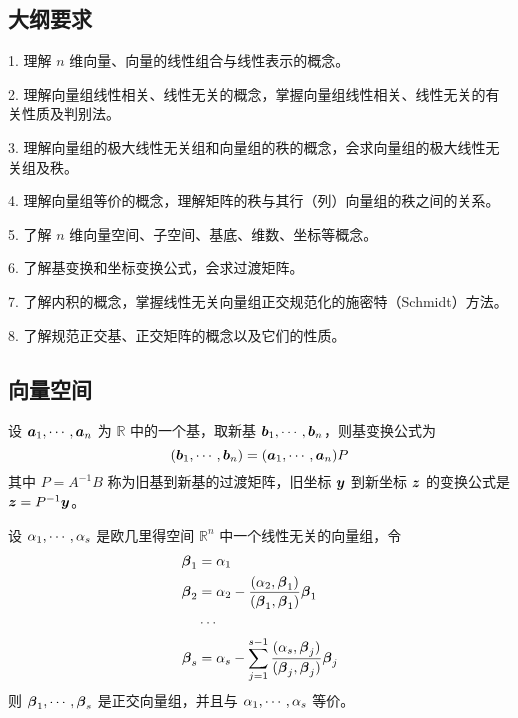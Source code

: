 \subsection{大纲要求}

1. 理解 $n$ 维向量、向量的线性组合与线性表示的概念。

2. 理解向量组线性相关、线性无关的概念，掌握向量组线性相关、线性无关的有关性质及判别法。

3. 理解向量组的极大线性无关组和向量组的秩的概念，会求向量组的极大线性无关组及秩。

4. 理解向量组等价的概念，理解矩阵的秩与其行（列）向量组的秩之间的关系。

5. 了解 $n$ 维向量空间、子空间、基底、维数、坐标等概念。

6. 了解基变换和坐标变换公式，会求过渡矩阵。

7. 了解内积的概念，掌握线性无关向量组正交规范化的施密特（Schmidt）方法。

8. 了解规范正交基、正交矩阵的概念以及它们的性质。

\subsection{向量空间}

设 $\boldsymbol{a}_1,\cdots,\boldsymbol{a}_n$ 为 $\mathbb{R}$ 中的一个基，取新基 $\boldsymbol{b}_1,\cdots,\boldsymbol{b}_n$，则基变换公式为
\[ (\boldsymbol{b}_1,\cdots,\boldsymbol{b}_n) =  (\boldsymbol{a}_1,\cdots,\boldsymbol{a}_n)P \]
其中 $P = A^{-1} B$ 称为旧基到新基的过渡矩阵，旧坐标 $\boldsymbol{y}$ 到新坐标 $\boldsymbol{z}$ 的变换公式是 $\boldsymbol{z} = P^{-1} \boldsymbol{y}$。

\begin{theorem}
	设 $\alpha_1,\cdots,\alpha_s$ 是欧几里得空间 $\mathbb{R}^n$ 中一个线性无关的向量组，令
	\[
		\begin{aligned}
			\boldsymbol{\beta}_1 & =\alpha_1                                                                                              \\
			\boldsymbol{\beta}_2 & =\alpha_2 - \frac{(\alpha_2,\boldsymbol{\beta}_1)}{(\boldsymbol{\beta}_1,\boldsymbol{\beta}_1)}\boldsymbol{\beta}_1                \\
			              & \cdots                                                                                                 \\
			\boldsymbol{\beta}_s & = \alpha_s-\sum_{j=1}^{s-1}\frac{(\alpha_s,\boldsymbol{\beta}_j)}{(\boldsymbol{\beta}_j,\boldsymbol{\beta}_j)}\boldsymbol{\beta}_j
		\end{aligned}
	\]
	则 $\boldsymbol{\beta}_1,\cdots,\boldsymbol{\beta}_s$ 是正交向量组，并且与 $\alpha_1,\cdots,\alpha_s$ 等价。
\end{theorem}

